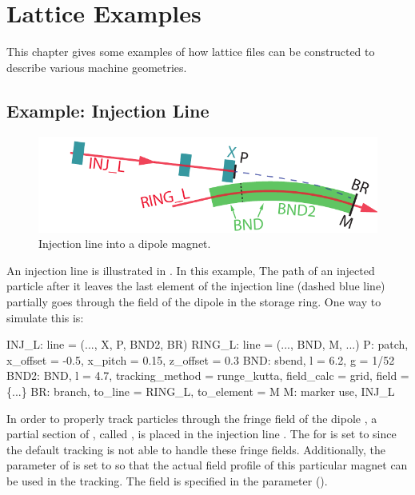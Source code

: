 \chapter{Lattice Examples}
\label{c:lat.example}

This chapter gives some examples of how lattice files can be constructed to
describe various machine geometries.

\section{Example: Injection Line}
\label{s:ex.inj}

\begin{figure}[tb]
  \centering
  \includegraphics[width=5in]{injection.pdf}
  \caption[Injection line into a dipole magnet.]{
Injection line into a dipole magnet.
  }
  \label{f:inject}
\end{figure}

An injection line is illustrated in . In this example,
The path of an injected particle after it leaves the last element
 of the injection line (dashed blue line) partially goes through
the field of the dipole  in the storage ring. One way to
simulate this is:
\begin{example}
  INJ_L: line = (..., X, P, BND2, BR)
  RING_L: line = (..., BND, M, ...)
  P: patch, x_offset = -0.5, x_pitch = 0.15, z_offset = 0.3 
  BND: sbend, l = 6.2, g = 1/52
  BND2: BND, l = 4.7, tracking_method = runge_kutta,
          field_calc = grid, field = \{...\}
  BR: branch, to_line = RING_L, to_element = M
  M: marker
  use, INJ_L
\end{example}

In order to properly track particles through the fringe field of the
dipole , a partial section of , called , is
placed in the injection line . The  for
 is set to  since the default
 tracking is not able to handle these fringe
fields. Additionally, the  parameter of  is
set to  so that the actual field profile of this particular
magnet can be used in the tracking. The field is specified in the
 parameter (). 

